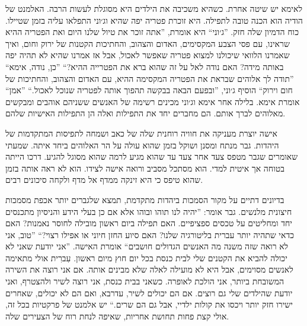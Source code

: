 \documentclass[14pt, article, extrafontsizes, twopage, a4paper]{memoir}
\begin{document}
לאימא יש שיטה אחרת. כשהיא משכיבה את הילדים היא מסוגלת לעשות
הרבה. האלמנט של הודיה הוא
הכנה טובה לתפילה. היא זוכרת פטריה יפה
שהיא וג׳וני התפלאו עליה בזמן שטיילו.
כוח הדמיון שלה חזק. ''ג׳וני`` היא
אומרת, ''אתה זוכר את טיול שלנו היום ואת הפטריה ההיא
שראינו, עם פסי הצבע המקסימים, האדום והצהוב,
והחתיכות הקטנות של ירוק וחום, ואיך שאמרנו
הלוואי שיכולנו למצוא פטריה שאפשר לאכול, אבל אז אמרנו
שהיא לא תהיה יפה באותה מידה? האם נודה לאל
על זה שהוא ברא את הפטרייה ההיא?“ ''כן, נודה,  אימא`` ''תודה לך
אלוהים שבראת את הפטריה המקסימה ההיא, עם האדום והצהוב,
והחתיכות של חום וירוק``  הוסיף ג׳וני, ''ובפעם
הבאה בבקשה תהפוך אותה לפטריה שנוכל לאכול.`` ''אמן``
אומרת  אימא. בלילה אחר  אימא וג׳וני
מכינים רשימה של האנשים ששניהם אוהבים ומבקשים מאלוהים
לברך אותם. הם מחברים יחד את התפילות ואלה הן
התפילות האישיות שלהם.

אישה יוצרת מעניקה את חוויה רוחנית שלה של
כאב ושמחה לתפיסות המתקדמות של היהדות.
גבר מנתח ומסנן ושוקל בזמן שהוא
עולה על הר האלוהים ביחד איתה. שמעתי שאומרים שגבר
מטפס צעד אחר צעד עד שהוא מגיע לרמה שהוא מסוגל
להגיע. דרכו הייתה בטוחה אך איטית למדי. הוא מסתכל
מסביב ורואה אישה לצידו. הוא לא ראה אותה
בזמן שהוא טיפס כי היא זינקה ממדף אל
מדף ולקחה סיכונים רבים.

בדיונים דתיים על מקור הסמכות
ביהדות מתקדמת, תמצא שלגברים יותר אכפת
מסמכות חיצונית מלנשים. גבר אומר: ”יהיה לנו
תוהו ובוהו אלא אם כן בעלי הידע והניסיון מתכנסים
יחד ומחליטים על טכסים ספציפיים. האם תפילה ביום ראשון
מובילה לחוסר נאמנות? האם כדאי שתהיה יותר עברית
בליטורגיה שלנו? האם סיוע החזן חיוני או
אפילו רצוי?“ ”טוב, אני לא רואה שזה משנה מה
האנשים הגדולים חושבים“ אומרת האישה. ”אני יודעת שאני לא יכולה להביא
את הקטנים שלי לבית כנסת בכל יום חוץ מיום ראשון. עִברִית
אולי מתאימה לאנשים מסוימים, אבל היא לא מועילה
לאלה שלא מבינים אותה. אם אני רוצה את השירה המשובחת ביותר,
אני הולכת לאופרה. כשאני בבית כנסת, אני רוצה
לשיר ולהצטרף, ואני יודעת שהילדים שלי גם רוצים. אם הם
יכולים לשיר, עדרבא, ואם הם לא יכולים, שאחרים
ישירו חזק יותר ויכסו את קולות ילדיי, אבל גם הם
שרים.“ יש אלמנט של פרקטיות בכל
זה, אולי קצת פחות תחושת אחריות, שאיפה
לנחת רוח של הצעירים שלה.
\end{document}
